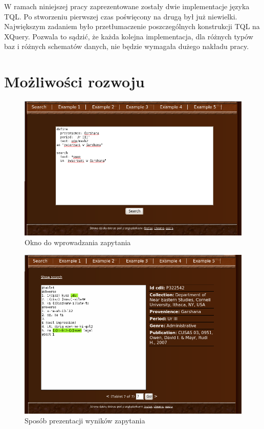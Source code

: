 W ramach niniejszej pracy zaprezentowane zostały dwie implementacje języka TQL. 
Po stworzeniu pierwszej czas poświęcony na drugą był już niewielki. 
Największym zadaniem było przetłumaczenie poszczególnych konstrukcji TQL na XQuery. 
Pozwala to sądzić, że każda kolejna implementacja, dla różnych typów baz i różnych schematów danych, 
nie będzie wymagała dużego nakładu pracy. 

\pagebreak

\section*{Możliwości rozwoju}
\begin{figure}[h]
 \centering
 \includegraphics[width=500px]{../diagramy/wyszuk_zapyt.png}
 \caption{Okno do wprowadzania zapytania}
 \label{fig:wyszuk_zapyt}
\end{figure}

\begin{figure}[h]
 \centering
 \includegraphics[width=500px]{../diagramy/wyszuk_wynik.png}
 \caption{Sposób prezentacji wyników zapytania}
 \label{fig:wyszuk_wynik}
\end{figure}

